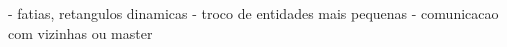 - fatias, retangulos dinamicas
- troco de entidades mais pequenas
- comunicacao com vizinhas ou master
